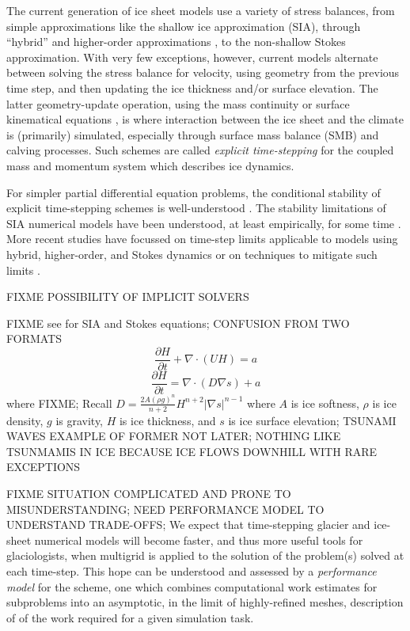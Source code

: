 \documentclass[twocolumn,letterpaper]{igs}
\newcommand{\Div}{\nabla\cdot}
\newcommand{\grad}{\nabla}
\begin{document}
The current generation of ice sheet models use a variety of stress balances, from simple approximations like the shallow ice approximation (SIA), through ``hybrid'' \citep[for example]{Winkelmannetal2011} and higher-order approximations \citep{GreveBlatter2009}, to the non-shallow Stokes approximation.  With very few exceptions, however, current models alternate between solving the stress balance for velocity, using geometry from the previous time step, and then updating the ice thickness and/or surface elevation.  The latter geometry-update operation, using the mass continuity or surface kinematical equations \cite{GreveBlatter2009}, is where interaction between the ice sheet and the climate is (primarily) simulated, especially through surface mass balance (SMB) and calving processes.  Such schemes are called \emph{explicit time-stepping} for the coupled mass and momentum system which describes ice dynamics.

For simpler partial differential equation problems, the conditional stability of explicit time-stepping schemes is well-understood \citep{LeVeque2007}.  The stability limitations of SIA numerical models have been understood, at least empirically, for some time \citep{HindmarshPayne1996}.  More recent studies have focussed on time-step limits applicable to models using hybrid, higher-order, and Stokes dynamics \citep{Chengetal2017,Robinsonetal2022} or on techniques to mitigate such limits \citep{LofgrenAhlkronaHelanow2021}.

FIXME POSSIBILITY OF IMPLICIT SOLVERS \citep{Bueler2016,WirbelJarosch2020}

FIXME see \citep{GreveBlatter2009,SchoofHewitt2013} for SIA and Stokes equations; CONFUSION FROM TWO FORMATS
    $$\frac{\partial H}{\partial t} + \Div \left(U H\right) = a$$
    $$\frac{\partial H}{\partial t} = \Div \left(D \grad s \right) + a$$
where FIXME; Recall $\displaystyle D = \frac{2 A (\rho g)^n}{n+2} H^{n+2} |\grad s|^{n-1}$ where $A$ is ice softness, $\rho$ is ice density, $g$ is gravity, $H$ is ice thickness, and $s$ is ice surface elevation; TSUNAMI WAVES EXAMPLE OF FORMER NOT LATER; NOTHING LIKE TSUNMAMIS IN ICE BECAUSE ICE FLOWS DOWNHILL WITH RARE EXCEPTIONS

FIXME SITUATION COMPLICATED AND PRONE TO MISUNDERSTANDING; NEED PERFORMANCE MODEL TO UNDERSTAND TRADE-OFFS; We expect that time-stepping glacier and ice-sheet numerical models will become faster, and thus more useful tools for glaciologists, when multigrid is applied to the solution of the problem(s) solved at each time-step.  This hope can be understood and assessed by a \emph{performance model} for the scheme, one which combines computational work estimates for subproblems into an asymptotic, in the limit of highly-refined meshes, description of of the work required for a given simulation task.
\end{document}
